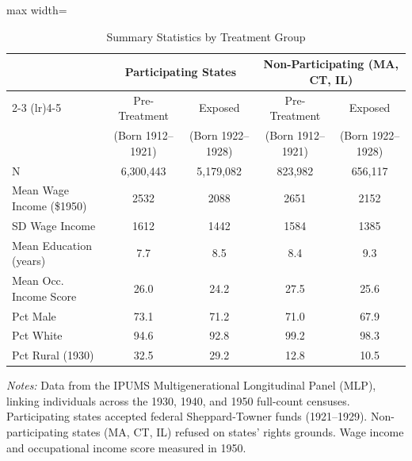 \begin{table}[htbp]
\centering
\caption{Summary Statistics by Treatment Group}
\label{tab:summary}
\begin{adjustbox}{max width=\textwidth}
\begin{threeparttable}
\begin{tabular}{lcccc}
\toprule
 & \multicolumn{2}{c}{Participating States} & \multicolumn{2}{c}{Non-Participating (MA, CT, IL)} \\
\cmidrule(lr){2-3} \cmidrule(lr){4-5}
 & Pre-Treatment & Exposed & Pre-Treatment & Exposed \\
 & (Born 1912--1921) & (Born 1922--1928) & (Born 1912--1921) & (Born 1922--1928) \\
\midrule
N & 6,300,443 & 5,179,082 & 823,982 & 656,117 \\
Mean Wage Income (\$1950) & 2532 & 2088 & 2651 & 2152 \\
SD Wage Income & 1612 & 1442 & 1584 & 1385 \\
Mean Education (years) & 7.7 & 8.5 & 8.4 & 9.3 \\
Mean Occ. Income Score & 26.0 & 24.2 & 27.5 & 25.6 \\
Pct Male & 73.1 & 71.2 & 71.0 & 67.9 \\
Pct White & 94.6 & 92.8 & 99.2 & 98.3 \\
Pct Rural (1930) & 32.5 & 29.2 & 12.8 & 10.5 \\
\bottomrule
\end{tabular}
\begin{tablenotes}[flushleft]\footnotesize
\item \textit{Notes:} Data from the IPUMS Multigenerational Longitudinal Panel (MLP), linking individuals across the 1930, 1940, and 1950 full-count censuses. Participating states accepted federal Sheppard-Towner funds (1921--1929). Non-participating states (MA, CT, IL) refused on states' rights grounds. Wage income and occupational income score measured in 1950.
\end{tablenotes}
\end{threeparttable}
\end{adjustbox}
\end{table}
